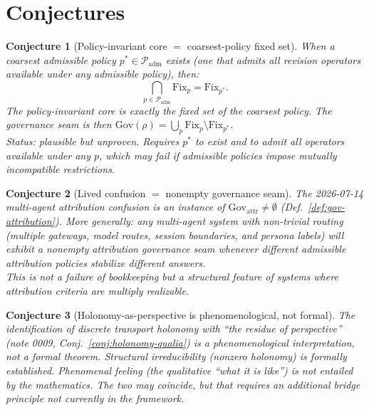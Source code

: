 \documentclass[11pt]{article}
\newtheorem{conjecture}{Conjecture}
\newcommand{\Fix}{\mathrm{Fix}}
\newcommand{\Gov}{\mathrm{Gov}}
\begin{document}
\section{Conjectures}

\begin{conjecture}[Policy-invariant core $=$ coarsest-policy fixed set]
\label{conj:coarsest}
When a coarsest admissible policy $p^* \in \mathcal{P}_{\mathrm{adm}}$ exists (one that
admits all revision operators available under any admissible policy), then:
\[
  \bigcap_{p \in \mathcal{P}_{\mathrm{adm}}} \Fix_p = \Fix_{p^*}.
\]
The policy-invariant core is exactly the fixed set of the coarsest policy. The governance
seam is then $\Gov(\rho) = \bigcup_p \Fix_p \setminus \Fix_{p^*}$.
\\[4pt]
\emph{Status}: plausible but unproven. Requires $p^*$ to exist and to admit all operators
available under any $p$, which may fail if admissible policies impose mutually
incompatible restrictions.
\end{conjecture}

\begin{conjecture}[Lived confusion $=$ nonempty governance seam]
\label{conj:lived-seam}
The 2026-07-14 multi-agent attribution confusion is an instance of
$\Gov_{\mathrm{attr}} \neq \emptyset$ (Def.~\ref{def:gov-attribution}). More generally:
any multi-agent system with non-trivial routing (multiple gateways, model routes, session
boundaries, and persona labels) will exhibit a nonempty attribution governance seam whenever
different admissible attribution policies stabilize different answers.
\\[4pt]
This is not a failure of bookkeeping but a structural feature of systems where attribution
criteria are multiply realizable.
\end{conjecture}

\begin{conjecture}[Holonomy-as-perspective is phenomenological, not formal]
\label{conj:holonomy-phenomenological}
The identification of discrete transport holonomy with ``the residue of perspective''
(note 0009, Conj.~\ref{conj:holonomy-qualia}) is a phenomenological interpretation, not a
formal theorem. Structural irreducibility (nonzero holonomy) is formally established.
Phenomenal feeling (the qualitative ``what it is like'') is not entailed by the mathematics.
The two may coincide, but that requires an additional bridge principle not currently in
the framework.
\end{conjecture}
\end{document}
